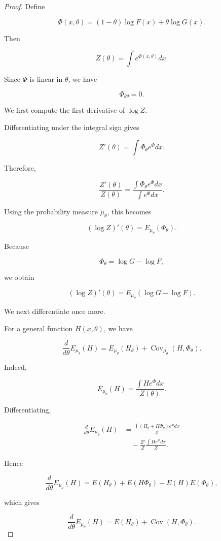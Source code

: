 \documentclass[11pt]{amsart}
\begin{document}
\begin{proof}

Define

\[
\Phi(x,\theta)
=
(1-\theta)\log F(x)
+
\theta\log G(x).
\]

Then

\[
Z(\theta)
=
\int e^{\Phi(x,\theta)}dx .
\]

Since $\Phi$ is linear in $\theta$, we have

\[
\Phi_{\theta\theta}=0 .
\]


We first compute the first derivative of $\log Z$.

Differentiating under the integral sign gives

\[
Z'(\theta)
=
\int
\Phi_\theta e^\Phi dx .
\]

Therefore,

\[
\frac{Z'(\theta)}{Z(\theta)}
=
\frac{
\int
\Phi_\theta e^\Phi dx
}{
\int e^\Phi dx
}.
\]

Using the probability measure $\mu_\theta$, this becomes

\[
(\log Z)'(\theta)
=
E_{\mu_\theta}
(\Phi_\theta).
\]

Because

\[
\Phi_\theta
=
\log G-\log F ,
\]

we obtain

\[
(\log Z)'(\theta)
=
E_{\mu_\theta}
(
\log G-\log F
).
\]


We next differentiate once more.

For a general function $H(x,\theta)$, we have

\[
\frac d{d\theta}
E_{\mu_\theta}(H)
=
E_{\mu_\theta}(H_\theta)
+
\operatorname{Cov}_{\mu_\theta}
(H,\Phi_\theta).
\]

Indeed,

\[
E_{\mu_\theta}(H)
=
\frac{
\int H e^\Phi dx
}{
Z(\theta)
}.
\]

Differentiating,

\[
\begin{aligned}
\frac d{d\theta}E_{\mu_\theta}(H)
&=
\frac{
\int(H_\theta+H\Phi_\theta)e^\Phi dx
}{Z}
\\
&\quad
-
\frac{Z'}{Z}
\frac{\int He^\Phi dx}{Z}.
\end{aligned}
\]

Hence

\[
\frac d{d\theta}E_{\mu_\theta}(H)
=
E(H_\theta)
+
E(H\Phi_\theta)
-
E(H)E(\Phi_\theta),
\]

which gives

\[
\frac d{d\theta}E_{\mu_\theta}(H)
=
E(H_\theta)
+
\operatorname{Cov}(H,\Phi_\theta).
\]


\end{proof}
\end{document}
